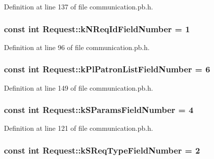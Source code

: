Definition at line 137 of file communication.\-pb.\-h.

\hypertarget{classRequest_a730d2f756f3ebc20ebd2362c3943cbcc}{
\subsubsection[{k\-N\-Req\-Id\-Field\-Number}]{\setlength{\rightskip}{0pt plus 5cm}const int Request\-::k\-N\-Req\-Id\-Field\-Number = 1\hspace{0.3cm}{\ttfamily [static]}}}\label{classRequest_a730d2f756f3ebc20ebd2362c3943cbcc}


Definition at line 96 of file communication.\-pb.\-h.

\hypertarget{classRequest_ab5f3c353ffd36fabb93b3e820d643086}{
\subsubsection[{k\-Pl\-Patron\-List\-Field\-Number}]{\setlength{\rightskip}{0pt plus 5cm}const int Request\-::k\-Pl\-Patron\-List\-Field\-Number = 6\hspace{0.3cm}{\ttfamily [static]}}}\label{classRequest_ab5f3c353ffd36fabb93b3e820d643086}


Definition at line 149 of file communication.\-pb.\-h.

\hypertarget{classRequest_a831555b68c690fcbe1aecb7027b6c2f1}{
\subsubsection[{k\-S\-Params\-Field\-Number}]{\setlength{\rightskip}{0pt plus 5cm}const int Request\-::k\-S\-Params\-Field\-Number = 4\hspace{0.3cm}{\ttfamily [static]}}}\label{classRequest_a831555b68c690fcbe1aecb7027b6c2f1}


Definition at line 121 of file communication.\-pb.\-h.

\hypertarget{classRequest_a51c18984ef771a8bb5d313a8b9b352e2}{
\subsubsection[{k\-S\-Req\-Type\-Field\-Number}]{\setlength{\rightskip}{0pt plus 5cm}const int Request\-::k\-S\-Req\-Type\-Field\-Number = 2\hspace{0.3cm}{\ttfamily [static]}}}\label{classRequest_a51c18984ef771a8bb5d313a8b9b352e2}


